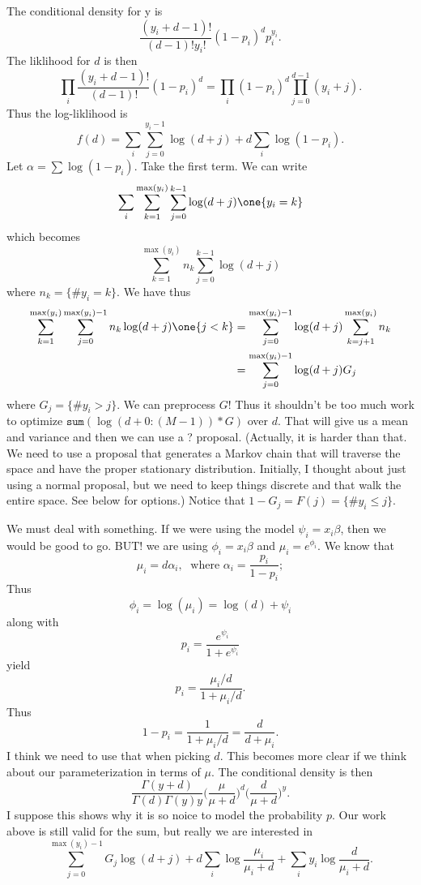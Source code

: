 \documentclass{article}
\begin{document}
The conditional density for y is
\[
\frac{(y_i+d-1)!}{(d-1)! y_i!} (1-p_i)^d p_i^{y_i}.
\]
The liklihood for $d$ is then
\[
\prod_{i} \frac{(y_i+d-1)!}{(d-1)!} (1-p_i)^d = \prod_i (1-p_i)^d \prod_{j=0}^{d-1} (y_i+ j).
\]
Thus the log-liklihood is
\[
f(d) = \sum_{i} \sum_{j=0}^{y_i-1} \log (d + j) + d \sum_i \log(1-p_i).
\]
Let $\alpha = \sum \log(1-p_i)$.  Take the first term.  We can write
\[
\sum_{i} \sum_{k=1}^{\max(y_i)} \sum_{j=0}^{k-1} \log(d+j) \one \{y_i = k\}
\]
which becomes
\[
\sum_{k=1}^{\max(y_i)} n_k \sum_{j=0}^{k-1} \log(d+j)
\]
where $n_k = \{ \# y_i = k \}$.  We have thus
\begin{align*}
\sum_{k=1}^{\max(y_i)} \sum_{j=0}^{\max(y_i)-1} n_k \log(d+j) \one\{j < k\}
& = 
\sum_{j=0}^{\max(y_i)-1} \log(d+j) \sum_{k=j+1}^{\max(y_i)} n_k \\
& = \sum_{j=0}^{\max(y_i)-1} \log(d+j) G_j
\end{align*}
where $G_j = \{ \# y_i > j \}$.  We can preprocess $G$!  Thus it shouldn't be
too much work to optimize $\texttt{sum}(\log(d+0:(M-1)) * G)$ over $d$.  That
will give us a mean and variance and then we can use a ? proposal.  (Actually,
it is harder than that.  We need to use a proposal that generates a Markov chain
that will traverse the space and have the proper stationary distribution.
Initially, I thought about just using a normal proposal, but we need to keep
things discrete and that walk the entire space.  See below for options.)  Notice
that $1-G_j = F(j) = \{\# y_i \leq j\}$.

We must deal with something.  If we were using the model $\psi_i = x_i \beta$,
then we would be good to go.  BUT! we are using $\phi_i = x_i \beta$ and $\mu_i
= e^{\phi_i}$.  We know that
\[
\mu_i = d \alpha_i, \; \text{ where } \alpha_i = \frac{p_i}{1-p_i};
\]
Thus
\[
\phi_i = \log(\mu_i) = \log(d) + \psi_i
\]
along with
\[
p_i = \frac{e^{\psi_i}}{1 + e^{\psi_i}}
\]
yield
\[
p_i = \frac{\mu_i/d}{1+\mu_i/d}.
\]
Thus
\[
1 - p_i = \frac{1}{1+\mu_i/d} = \frac{d}{d+\mu_i}.
\]
I think we need to use that when picking $d$.  This becomes more clear if we think
about our parameterization in terms of $\mu$.  The conditional density is then
\[
\frac{\Gamma(y+d)}{\Gamma(d) \Gamma(y) y} \Big( \frac{\mu}{\mu+d} \Big)^d
\Big(\frac{d}{\mu+d}\Big)^y.
\]
I suppose this shows why it is so noice to model the probability $p$.  Our work
above is still valid for the sum, but really we are interested in
\[
\sum_{j=0}^{\max(y_i)-1} G_j \log(d+j) + d \sum_{i} \log \frac{\mu_i}{\mu_i+d} +
\sum_i y_i \log \frac{d}{\mu_i+d}.
\]
\end{document}
